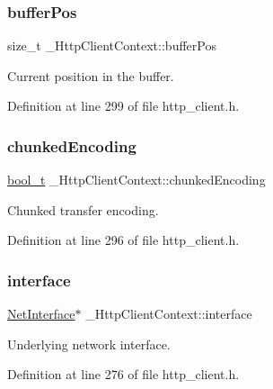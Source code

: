 \subsubsection{\texorpdfstring{buffer\+Pos}{bufferPos}}
{\footnotesize\ttfamily size\+\_\+t \+\_\+\+Http\+Client\+Context\+::buffer\+Pos}



Current position in the buffer. 



Definition at line 299 of file http\+\_\+client.\+h.

\mbox{\label{struct__HttpClientContext_a9e67b368673dfe95e80426aceec2fe97}} 
\subsubsection{\texorpdfstring{chunked\+Encoding}{chunkedEncoding}}
{\footnotesize\ttfamily \hyperlink{compiler__port_8h_a812d16e5494522586b3784e55d479912}{bool\+\_\+t} \+\_\+\+Http\+Client\+Context\+::chunked\+Encoding}



Chunked transfer encoding. 



Definition at line 296 of file http\+\_\+client.\+h.

\mbox{\label{struct__HttpClientContext_a548b3ebd3e51ba4815c1ec4e7a3cc160}} 
\subsubsection{\texorpdfstring{interface}{interface}}
{\footnotesize\ttfamily \hyperlink{net_8h_a2234db8911a1148c9159979d8f5e0d6b}{Net\+Interface}$\ast$ \+\_\+\+Http\+Client\+Context\+::interface}



Underlying network interface. 



Definition at line 276 of file http\+\_\+client.\+h.


